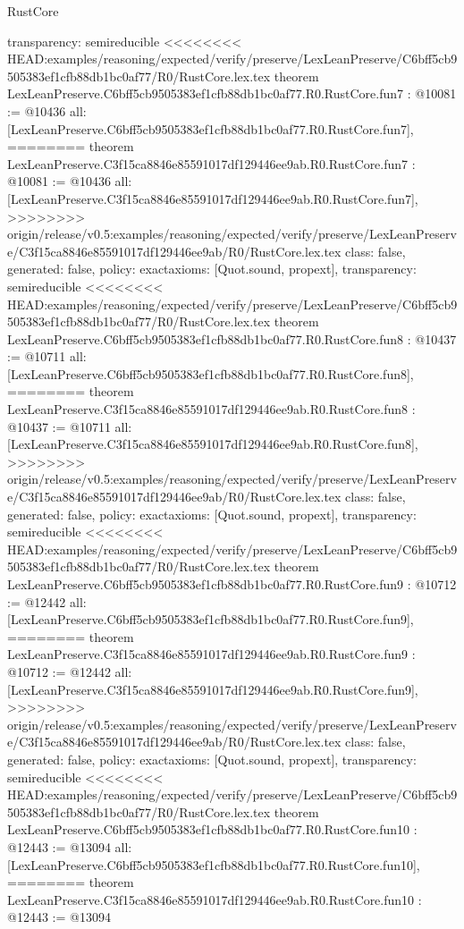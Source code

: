 \begin{lexlean}{RustCore}
\begin{coremodule}
{\begin{coremodule}
{{{{{{{{{{  transparency: semireducible
}
<<<<<<<< HEAD:examples/reasoning/expected/verify/preserve/LexLeanPreserve/C6bff5cb9505383ef1cfb88db1bc0af77/R0/RustCore.lex.tex
theorem LexLeanPreserve.C6bff5cb9505383ef1cfb88db1bc0af77.R0.RustCore.fun7 : @10081 := @10436 {
  all: [LexLeanPreserve.C6bff5cb9505383ef1cfb88db1bc0af77.R0.RustCore.fun7],
========
theorem LexLeanPreserve.C3f15ca8846e85591017df129446ee9ab.R0.RustCore.fun7 : @10081 := @10436 {
  all: [LexLeanPreserve.C3f15ca8846e85591017df129446ee9ab.R0.RustCore.fun7],
>>>>>>>> origin/release/v0.5:examples/reasoning/expected/verify/preserve/LexLeanPreserve/C3f15ca8846e85591017df129446ee9ab/R0/RustCore.lex.tex
  class: false,
  generated: false,
  policy: exact{axioms: [Quot.sound, propext]},
  transparency: semireducible
}
<<<<<<<< HEAD:examples/reasoning/expected/verify/preserve/LexLeanPreserve/C6bff5cb9505383ef1cfb88db1bc0af77/R0/RustCore.lex.tex
theorem LexLeanPreserve.C6bff5cb9505383ef1cfb88db1bc0af77.R0.RustCore.fun8 : @10437 := @10711 {
  all: [LexLeanPreserve.C6bff5cb9505383ef1cfb88db1bc0af77.R0.RustCore.fun8],
========
theorem LexLeanPreserve.C3f15ca8846e85591017df129446ee9ab.R0.RustCore.fun8 : @10437 := @10711 {
  all: [LexLeanPreserve.C3f15ca8846e85591017df129446ee9ab.R0.RustCore.fun8],
>>>>>>>> origin/release/v0.5:examples/reasoning/expected/verify/preserve/LexLeanPreserve/C3f15ca8846e85591017df129446ee9ab/R0/RustCore.lex.tex
  class: false,
  generated: false,
  policy: exact{axioms: [Quot.sound, propext]},
  transparency: semireducible
}
<<<<<<<< HEAD:examples/reasoning/expected/verify/preserve/LexLeanPreserve/C6bff5cb9505383ef1cfb88db1bc0af77/R0/RustCore.lex.tex
theorem LexLeanPreserve.C6bff5cb9505383ef1cfb88db1bc0af77.R0.RustCore.fun9 : @10712 := @12442 {
  all: [LexLeanPreserve.C6bff5cb9505383ef1cfb88db1bc0af77.R0.RustCore.fun9],
========
theorem LexLeanPreserve.C3f15ca8846e85591017df129446ee9ab.R0.RustCore.fun9 : @10712 := @12442 {
  all: [LexLeanPreserve.C3f15ca8846e85591017df129446ee9ab.R0.RustCore.fun9],
>>>>>>>> origin/release/v0.5:examples/reasoning/expected/verify/preserve/LexLeanPreserve/C3f15ca8846e85591017df129446ee9ab/R0/RustCore.lex.tex
  class: false,
  generated: false,
  policy: exact{axioms: [Quot.sound, propext]},
  transparency: semireducible
}
<<<<<<<< HEAD:examples/reasoning/expected/verify/preserve/LexLeanPreserve/C6bff5cb9505383ef1cfb88db1bc0af77/R0/RustCore.lex.tex
theorem LexLeanPreserve.C6bff5cb9505383ef1cfb88db1bc0af77.R0.RustCore.fun10 : @12443 := @13094 {
  all: [LexLeanPreserve.C6bff5cb9505383ef1cfb88db1bc0af77.R0.RustCore.fun10],
========
theorem LexLeanPreserve.C3f15ca8846e85591017df129446ee9ab.R0.RustCore.fun10 : @12443 := @13094 {
}}}}}}}}}}}}}}
\end{coremodule}}
\end{coremodule}
\end{lexlean}
